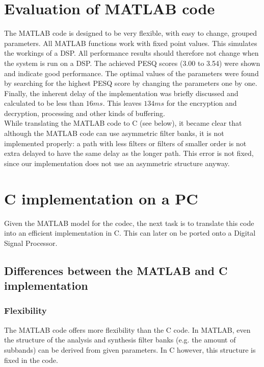 \documentclass[a4paper]{article}
\begin{document}
\section{Evaluation of MATLAB code}
The MATLAB code is designed to be very flexible, with easy to change, grouped parameters. All MATLAB functions work with fixed point values. This simulates the workings of a DSP. All performance results should therefore not change when the system is run on a DSP. The achieved PESQ scores (3.00 to 3.54) were shown and indicate good performance. The optimal values of the parameters were found by searching for the highest PESQ score by changing the parameters one by one. Finally, the inherent delay of the implementation was briefly discussed and calculated to be less than $16ms$. This leaves $134ms$ for the encryption and decryption, processing and other kinds of buffering.\\

While translating the MATLAB code to C (see below), it became clear that although the MATLAB code can use asymmetric filter banks, it is not implemented properly: a path with less filters or filters of smaller order is not extra delayed to have the same delay as the longer path. This error is not fixed, since our implementation does not use an asymmetric structure anyway.

\section{C implementation on a PC}
Given the MATLAB model for the codec, the next task is to translate this code into an efficient implementation in C. This can later on be ported onto a Digital Signal Processor.
\subsection{Differences between the MATLAB and C implementation}\label{sec:differences}
\subsubsection{Flexibility}
The MATLAB code offers more flexibility than the C code. In MATLAB, even the structure of the analysis and synthesis filter banks (e.g. the amount of subbands) can be derived from given parameters. In C however, this structure is fixed in the code.\\
\end{document}

